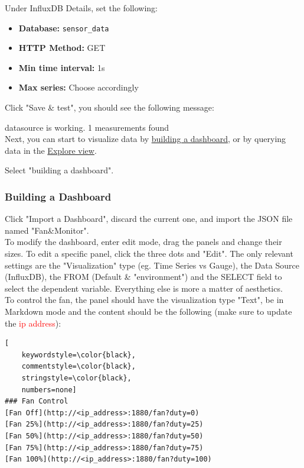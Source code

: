 \documentclass[onecolumn]{article}
\begin{document}
Under InfluxDB Details, set the following:

\begin{itemize}
    \item \textbf{Database:} \texttt{sensor\_data}
    \item \textbf{HTTP Method:} GET
    \item \textbf{Min time interval:} 1s
    \item \textbf{Max series:} Choose accordingly
\end{itemize}

Click "Save \& test", you should see the following message:

\begin{tcolorbox}[colback=white,colframe=black!100, arc=0mm, boxrule=0.4pt]
     datasource is working. 1 measurements found \\
Next, you can start to visualize data by \underline{building a dashboard}, or by querying data in the \underline{Explore view}.
\end{tcolorbox}

Select "building a dashboard".

\subsubsection{Building a Dashboard}
\normalsize
Click "Import a Dashboard", discard the current one, and import the JSON file named "Fan\&Monitor".\\

To modify the dashboard, enter edit mode, drag the panels and change their sizes. To edit a specific panel, click the three dots and "Edit". The only relevant settings are the "Visualization" type (eg. Time Series vs Gauge), the Data Source (InfluxDB), the FROM (Default \& "environment") and the SELECT field to select the dependent variable. Everything else is more a matter of aesthetics. \\

To control the fan, the panel should have the visualization type "Text", be in Markdown mode and the content should be the following (make sure to update the \textcolor{red}{ip address}): \\

\begin{lstlisting}[
    keywordstyle=\color{black},
    commentstyle=\color{black},
    stringstyle=\color{black},
    numbers=none]
### Fan Control 
[Fan Off](http://<ip_address>:1880/fan?duty=0)  
[Fan 25%](http://<ip_address>:1880/fan?duty=25) 
[Fan 50%](http://<ip_address>:1880/fan?duty=50) 
[Fan 75%](http://<ip_address>:1880/fan?duty=75) 
[Fan 100%](http://<ip_address>:1880/fan?duty=100)
\end{lstlisting}
\end{document}
